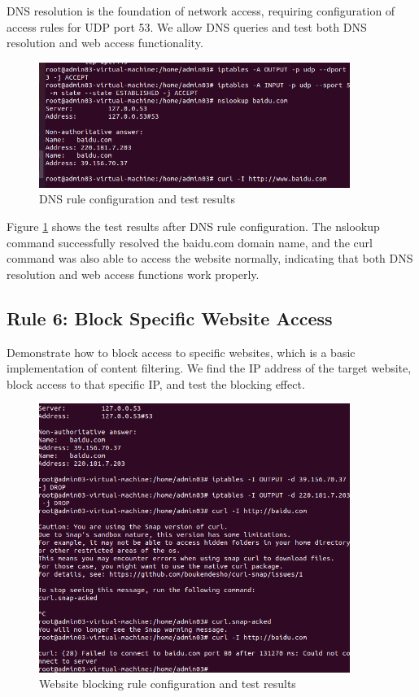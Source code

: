 \documentclass[12pt,a4paper]{article}
\begin{document}
DNS resolution is the foundation of network access, requiring configuration of access rules for UDP port 53. We allow DNS queries and test both DNS resolution and web access functionality.

\begin{figure}[H]
    \centering
    \includegraphics[width=0.9\textwidth]{07_dns_rule.png}
    \caption{DNS rule configuration and test results}
    \label{fig:dns_rule}
\end{figure}

Figure \ref{fig:dns_rule} shows the test results after DNS rule configuration. The nslookup command successfully resolved the baidu.com domain name, and the curl command was also able to access the website normally, indicating that both DNS resolution and web access functions work properly.

\subsection{Rule 6: Block Specific Website Access}

Demonstrate how to block access to specific websites, which is a basic implementation of content filtering. We find the IP address of the target website, block access to that specific IP, and test the blocking effect.

\begin{figure}[H]
    \centering
    \includegraphics[width=0.9\textwidth]{08_block_websit.png}
    \caption{Website blocking rule configuration and test results}
    \label{fig:block_website}
\end{figure}
\end{document}
